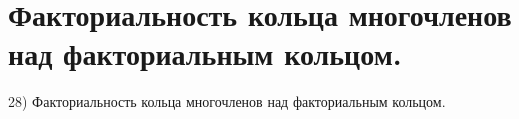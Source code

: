 \section{
 Факториальность кольца многочленов над факториальным кольцом.
}

28) Факториальность кольца многочленов над факториальным кольцом.
